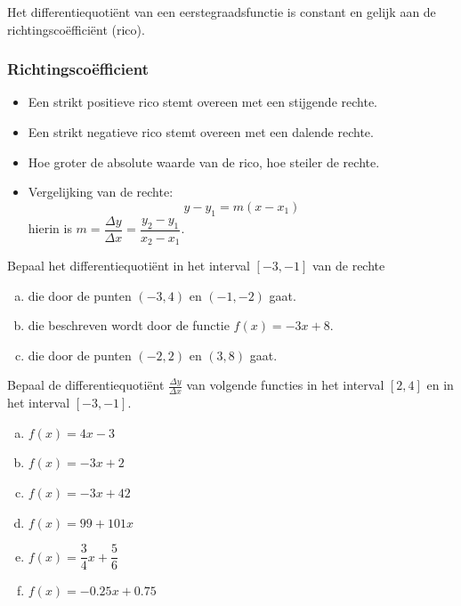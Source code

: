 \documentclass[12pt]{article}
\begin{document}
\begin{theorie}
Het differentiequotiënt van een eerstegraadsfunctie is constant en gelijk aan de richtingscoëfficiënt (rico).

\subsubsection{Richtingscoëfficient}
\begin{itemize}
\item Een strikt positieve rico stemt overeen met een stijgende rechte.
\item Een strikt negatieve rico stemt overeen met een dalende rechte.
\item Hoe groter de absolute waarde van de rico, hoe steiler de rechte.
\item Vergelijking van de rechte:
  $$y-y_1=m(x-x_1)$$
  hierin is $m=\dfrac{\Delta y}{\Delta x}=\dfrac{y_2-y_1}{x_2-x_1}$.
\end{itemize}

\end{theorie}

\begin{oefening}
  Bepaal het differentiequotiënt in het interval $[-3,-1]$ van de rechte
  \begin{enumerate}[(a)]
  \item die door de punten $(-3, 4)$ en $(-1, -2)$ gaat.
  \item die beschreven wordt door de functie $f(x)=-3x+8$.
  \item die door de punten $(-2, 2)$ en $(3, 8)$ gaat.
  \end{enumerate}
\end{oefening}

\begin{oefening}
Bepaal de differentiequotiënt $\frac{\Delta y}{\Delta x}$ van volgende functies in het interval $[2,4]$ en in het interval $[-3,-1]$.
\begin{multicols}{2}
\begin{enumerate}[(a)]
  \itemsep.2em
  \item $\displaystyle f(x)=4x-3$
  \item $\displaystyle f(x)=-3x+2$
  \item $\displaystyle f(x)=-3x+42$
  \item $\displaystyle f(x)=99+101x$
  \item $\displaystyle f(x)=\dfrac{3}{4}x+\dfrac{5}{6}$
  \item $\displaystyle f(x)=-0.25x+0.75$
\end{enumerate}
\end{multicols}
\end{oefening}
\end{document}

